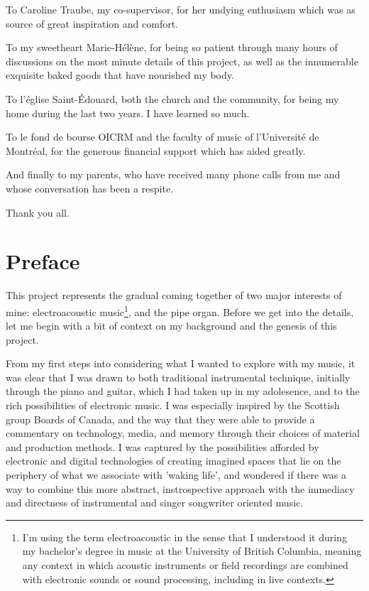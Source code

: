 \documentclass[12pt,twoside,maitrise]{dms_ks}
\theoremstyle{definition}
\begin{document}
To Caroline Traube, my co-supervisor, for her undying enthusiasm which was as source of great inspiration and comfort.

To my sweetheart Marie-Hélène, for being so patient through many hours of discussions on the most minute details of this project, as well as the innumerable exquisite baked goods that have nourished my body.

To l'église Saint-Édouard, both the church and the community, for being my home during the last two years. I have learned so much.

To le fond de bourse OICRM and the faculty of music of l'Université de Montréal, for the generous financial support which has aided greatly.

And finally to my parents, who have received many phone calls from me and whose conversation has been a respite.

Thank you all.


\NoChapterPageNumber
\cleardoublepage


\chapter*{Preface}


This project represents the gradual coming together of two major interests of mine: electroacoustic music\footnote{I'm using the term electroacoustic in the sense that I understood it during my bachelor's degree in music at the University of British Columbia, meaning any context in which acoustic instruments or field recordings are combined with electronic sounds or sound processing, including in live contexts.}, and the pipe organ. 
Before we get into the details, let me begin with a bit of context on my background and the genesis of this project.

From my first steps into considering what I wanted to explore with my music, it was clear that I was drawn to both traditional instrumental technique, initially through the piano and guitar, which I had taken up in my adolesence, and to the rich possibilities of electronic music. 
I was especially inspired by the Scottish group Boards of Canada, and the way that they were able to provide a commentary on technology, media, and memory through their choices of material and production methods. 
I was captured by the possibilities afforded by electronic and digital technologies of creating imagined spaces that lie on the periphery of what we associate with 'waking life', and wondered if there was a way to combine this more abstract, instrospective approach with the immediacy and directness of instrumental and singer songwriter oriented music.
\end{document}
